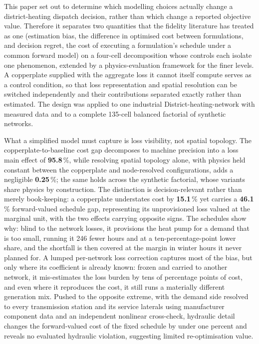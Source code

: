 
This paper set out to determine which modelling choices actually change a district-heating
dispatch decision, rather than which change a reported objective value. Therefore it
separates two quantities that the fidelity literature has treated as one (estimation
bias, the difference in optimised cost between formulations, and decision regret, the cost
of executing a formulation's schedule under a common forward model) on a four-cell
decomposition whose controls each isolate one phenomenon, extended by a physics-evaluation
framework for the finer levels. A copperplate supplied with the
aggregate loss it cannot itself compute serves as a control condition, so that loss
representation and spatial resolution can be switched independently and their contributions
separated exactly rather than estimated. The design was applied to one industrial District-heating-network
with measured data and to a complete 135-cell balanced factorial of synthetic networks.

What a simplified model must capture is loss visibility, not spatial topology. The
copperplate-to-baseline cost gap decomposes to machine precision into a loss main effect of
\textbf{95.8}\,\%, while resolving spatial topology alone, with physics held constant between the
copperplate and node-resolved configurations, adds a negligible \textbf{0.25}\,\%; the same holds
across the synthetic factorial, whose variants share physics by construction. The distinction is
decision-relevant rather than merely book-keeping: a copperplate understates cost by
\textbf{15.1}\,\% yet carries a \textbf{46.1}\,\% forward-valued schedule gap, representing its
unprovisioned loss valued at the marginal unit, with the two effects carrying opposite signs. The
schedules show why: blind to the network losses, it provisions the heat pump for a demand that is
too small, running it 246 fewer hours and at a ten-percentage-point lower share, and the shortfall
is then covered at the margin in winter hours it never planned for. A lumped per-network loss
correction captures most of the bias, but only where its coefficient is already known: frozen and
carried to another network, it mis-estimates the loss burden by tens of percentage points of cost,
and even where it reproduces the cost, it still runs a materially different generation mix.
Pushed to the opposite extreme, with the demand side resolved to every transmission station and
its service laterals using manufacturer component data and an independent nonlinear cross-check,
hydraulic detail changes the forward-valued cost of the fixed schedule by under one percent and reveals no evaluated hydraulic violation, suggesting limited re-optimisation value.

